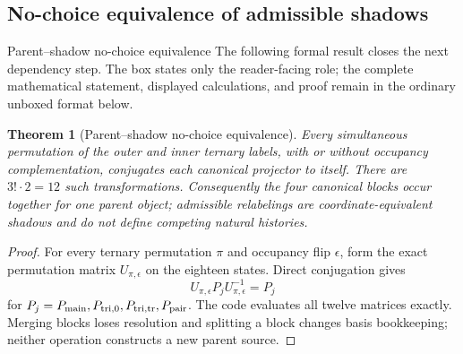 \documentclass[11pt]{article}
\numberwithin{equation}{section}
\newtheorem{theorem}[definition]{Theorem}
\theoremstyle{remark}
\begin{document}
\subsection{No-choice equivalence of admissible shadows}
\begin{proofguide}{Parent--shadow no-choice equivalence}
The following formal result closes the next dependency step. The box states only the reader-facing role; the complete mathematical statement, displayed calculations, and proof remain in the ordinary unboxed format below.
\end{proofguide}
\begin{theorem}[Parent--shadow no-choice equivalence]
Every simultaneous permutation of the outer and inner ternary labels, with or without occupancy complementation, conjugates each canonical projector to itself. There are $3!\cdot2=12$ such transformations. Consequently the four canonical blocks occur together for one parent object; admissible relabelings are coordinate-equivalent shadows and do not define competing natural histories.
\end{theorem}
\begin{proof}
For every ternary permutation $\pi$ and occupancy flip $\epsilon$, form the exact permutation matrix $U_{\pi,\epsilon}$ on the eighteen states. Direct conjugation gives
\begin{equation}
U_{\pi,\epsilon}P_jU_{\pi,\epsilon}^{-1}=P_j
\end{equation}
for $P_j=P_{\rm main},P_{\rm tri,0},P_{\rm tri,tr},P_{\rm pair}$. The code evaluates all twelve matrices exactly. Merging blocks loses resolution and splitting a block changes basis bookkeeping; neither operation constructs a new parent source.
\end{proof}
\end{document}

